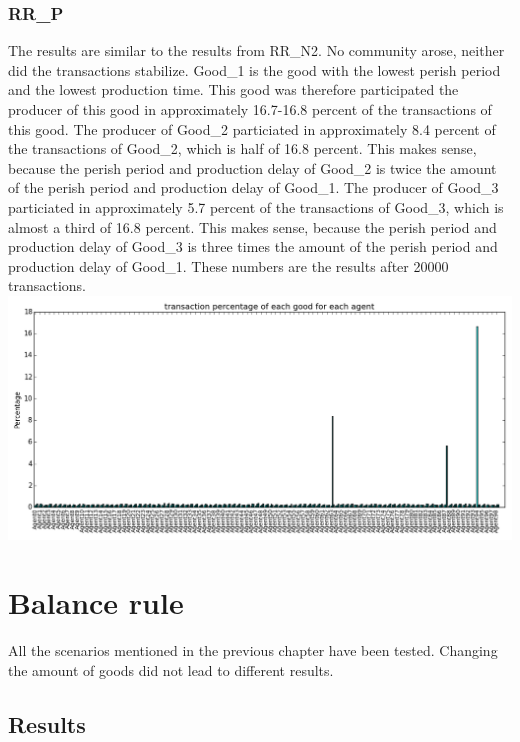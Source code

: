 \documentclass[twoside,openright]{uva-bachelor-thesis}
\begin{document}
\subsubsection{RR\_P}
The results are similar to the results from RR\_N2. No community arose, neither did the transactions stabilize. Good\_1 is the good with the lowest perish period and the lowest production time. This good was therefore participated the producer of this good in approximately 16.7-16.8 percent of the transactions of this good. The producer of Good\_2 particiated in approximately 8.4 percent of the transactions of Good\_2, which is half of 16.8 percent. This makes sense, because the perish period and production delay of Good\_2 is twice the amount of the perish period and production delay of Good\_1. The producer of Good\_3 particiated in approximately 5.7 percent of the transactions of Good\_3, which is almost a third of 16.8 percent. This makes sense, because the perish period and production delay of Good\_3 is three times the amount of the perish period and production delay of Good\_1. 
These numbers are the results after 20000 transactions. \\
\includegraphics[scale=0.5]{experiment_images/RR_P}

\section{Balance rule}
All the scenarios mentioned in the previous chapter have been tested. Changing the amount of goods did not lead to different results.
\subsection{Results}
\end{document}
